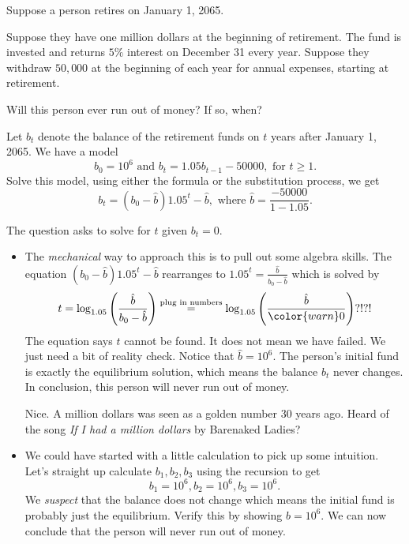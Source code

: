 \documentclass[../main.tex]{subfiles}
\begin{document}
\begin{exercise}
  Suppose a person retires on January 1, 2065.

  Suppose they have one million dollars at the beginning of retirement.  The fund is invested and returns \(5\%\) interest on December 31 every year. Suppose they withdraw \(50,000\) at the beginning of each year for annual expenses, starting at retirement.

  Will this person ever run out of money? If so, when?

  \begin{solution}
    Let \(b_{t}\) denote the balance of the retirement funds on \(t\) years after January 1, 2065.  We have a model
    \[
      b_{0} = 10^{6} \text{ and } b_{t} = 1.05 b_{t-1} - 50000,\text{ for \(t \ge 1\)}.
    \]
    Solve this model, using either the formula or the substitution process, we get
    \[
      b_{t} = (b_{0} - \hat{b}) 1.05^{t} - \hat{b}, \text{ where } \hat{b} = \frac{-50000}{1 - 1.05}.
    \]

    The question asks to solve for \(t\) given \(b_{t} = 0\).  
    \begin{itemize}
      \item The \emph{mechanical} way to approach this is to pull out some algebra skills. The equation \(\left( b_{0} - \hat{b} \right) 1.05^{t} - \hat{b}\) rearranges to \(1.05^{t} = \frac{\hat{b}}{b_{0} - \hat{b}}\) which is solved by
        \[
          t = \log_{1.05}\left( \frac{\hat{b}}{b_{0} - \hat{b}} \right) \overset{\text{plug in numbers}}{=} \log_{1.05}\left( \frac{\hat{b}}{{\color{warn} 0}} \right)?!?!
        \]
        The equation says \(t\) cannot be found. It does not mean we have failed. We just need a bit of reality check.  Notice that \(\hat{b} = 10^{6}\). The person's initial fund is exactly the equilibrium solution, which means the balance \(b_{t}\) never changes. In conclusion, this person will never run out of money. 

        Nice. A million dollars was seen as a golden number 30 years ago. Heard of the song \emph{If I had a million dollars} by Barenaked Ladies?

      \item We could have started with a little calculation to pick up some intuition. Let's straight up calculate \(b_{1}, b_{2}, b_{3}\) using the recursion to get
        \[
          b_{1} = 10^{6}, b_{2} = 10^{6}, b_{3} = 10^{6}.
        \]
        We \emph{suspect} that the balance does not change which means the initial fund is probably just the equilibrium.  Verify this by showing \(\hat{b} = 10^{6}\). We can now conclude that the person will never run out of money.
    \end{itemize}


\end{solution}
\end{exercise}
\end{document}
